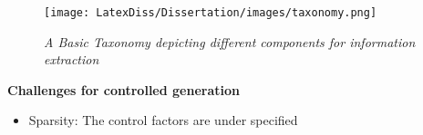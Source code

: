 \begin{figure}[t]
\centering
\texttt{[image: LatexDiss/Dissertation/images/taxonomy.png]}
\caption{\textit{A Basic Taxonomy depicting different components for information extraction}} 
\label{taxonomy}
\end{figure}  


\textbf{Challenges for controlled generation} 

\begin{itemize}
    \item Sparsity: The control factors are under specified 
    
\end{itemize}
